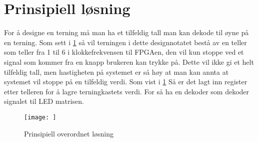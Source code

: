 \section{Prinsipiell løsning}
\label{prinsipiellLoesning}


For å designe en terning må man ha et tilfeldig tall man kan dekode til øyne på en terning. Som sett i \ref{fig:Fig1} så vil terningen i dette designnotatet bestå av en teller som teller fra 1 til 6 i klokkefrekvensen til FPGAen, den vil kun stoppe ved et signal som kommer fra en knapp brukeren kan trykke på. Dette vil ikke gi et helt tilfeldig tall, men hastigheten på systemet er så høy at man kan annta at systemet vil stoppe på en tilfeldig verdi. Som vist i \ref{fig:Fig1} Så er det lagt inn register etter telleren for å lagre terningkastets verdi. For så ha en dekoder som dekoder signalet til LED matrisen. 

\begin{figure}[htbp]
  \centering
  \texttt{[image: ]} 
  \caption{Prinsipiell overordnet løsning}
  \label{fig:Fig1}
\end{figure}

